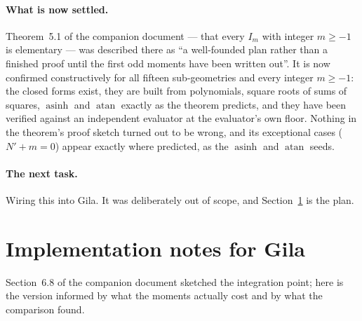 \documentclass[11pt]{article}
\theoremstyle{remark}
\newcommand{\asinh}{\operatorname{asinh}}
\newcommand{\atan}{\operatorname{atan}}
\begin{document}
\paragraph{What is now settled.} Theorem~5.1 of the companion document --- that every
$I_m$ with integer $m \ge -1$ is elementary --- was described there as ``a well-founded
plan rather than a finished proof until the first odd moments have been written out''. It
is now confirmed constructively for all fifteen sub-geometries and every integer
$m \ge -1$: the closed forms exist, they are built from polynomials, square roots of sums
of squares, $\asinh$ and $\atan$ exactly as the theorem predicts, and they have been
verified against an independent evaluator at the evaluator's own floor. Nothing in the
theorem's proof sketch turned out to be wrong, and its exceptional cases ($N'+m = 0$)
appear exactly where predicted, as the $\asinh$ and $\atan$ seeds.

\paragraph{The next task.} Wiring this into Gila. It was deliberately out of scope, and
Section~\ref{sec:impl} is the plan.

\section{Implementation notes for Gila}
\label{sec:impl}

Section~6.8 of the companion document sketched the integration point; here is the version
informed by what the moments actually cost and by what the comparison found.
\end{document}
